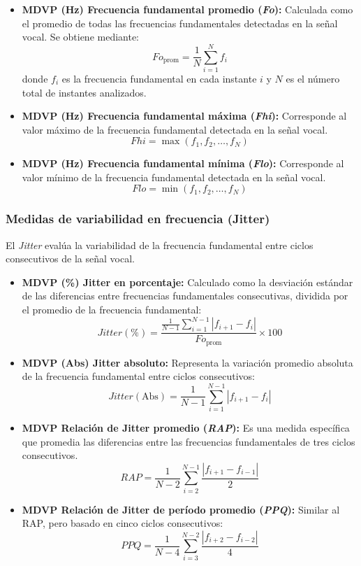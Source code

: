 \documentclass[listof=nochaptergap,12pt,times,authoryear]{report}
\begin{document}
\begin{itemize}
    \item \textbf{MDVP (Hz) Frecuencia fundamental promedio (\textit{Fo}):} Calculada como el promedio de todas las frecuencias fundamentales detectadas en la señal vocal. Se obtiene mediante:
    \[
    Fo_{\text{prom}} = \frac{1}{N} \sum_{i=1}^N f_i
    \]
    donde \(f_i\) es la frecuencia fundamental en cada instante \(i\) y \(N\) es el número total de instantes analizados.

    \item \textbf{MDVP (Hz) Frecuencia fundamental máxima (\textit{Fhi}):} Corresponde al valor máximo de la frecuencia fundamental detectada en la señal vocal. 
    \[
    Fhi = \max(f_1, f_2, \ldots, f_N)
    \]

    \item \textbf{MDVP (Hz) Frecuencia fundamental mínima (\textit{Flo}):} Corresponde al valor mínimo de la frecuencia fundamental detectada en la señal vocal. 
    \[
    Flo = \min(f_1, f_2, \ldots, f_N)
    \]
\end{itemize}

\subsubsection{Medidas de variabilidad en frecuencia (Jitter)}

El \textit{Jitter} evalúa la variabilidad de la frecuencia fundamental entre ciclos consecutivos de la señal vocal.

\begin{itemize}
    \item \textbf{MDVP (\%) Jitter en porcentaje:} Calculado como la desviación estándar de las diferencias entre frecuencias fundamentales consecutivas, dividida por el promedio de la frecuencia fundamental:
    \[
    Jitter(\%) = \frac{\frac{1}{N-1} \sum_{i=1}^{N-1} |f_{i+1} - f_i|}{Fo_{\text{prom}}} \times 100
    \]

    \item \textbf{MDVP (Abs) Jitter absoluto:} Representa la variación promedio absoluta de la frecuencia fundamental entre ciclos consecutivos:
    \[
    Jitter(\text{Abs}) = \frac{1}{N-1} \sum_{i=1}^{N-1} |f_{i+1} - f_i|
    \]
    
    \item \textbf{MDVP Relación de Jitter promedio (\textit{RAP}):} Es una medida específica que promedia las diferencias entre las frecuencias fundamentales de tres ciclos consecutivos.
    \[
    RAP = \frac{1}{N-2} \sum_{i=2}^{N-1} \frac{|f_{i+1} - f_{i-1}|}{2}
    \]
    
    \item \textbf{MDVP Relación de Jitter de período promedio (\textit{PPQ}):} Similar al RAP, pero basado en cinco ciclos consecutivos:
    \[
    PPQ = \frac{1}{N-4} \sum_{i=3}^{N-2} \frac{|f_{i+2} - f_{i-2}|}{4}
    \]
\end{itemize}
\end{document}
